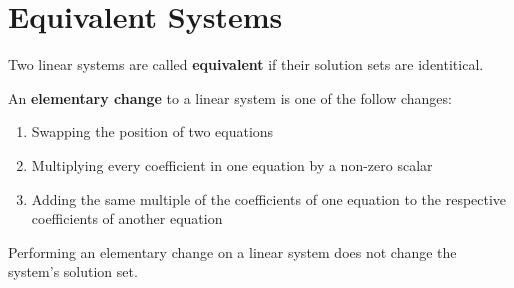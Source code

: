 \section{Equivalent Systems}
\begin{definition}[Equivalent]\label{def:equivalent}
    Two linear systems are called \textbf{equivalent} if their solution sets are identitical.
\end{definition}
\begin{definition}\label{def:elementary-change}
    An \textbf{elementary change} to a linear system is one of the follow changes:
    \begin{enumerate}
        \item Swapping the position of two equations
        \item Multiplying every coefficient in one equation by a non-zero scalar
        \item Adding the same multiple of the coefficients of one equation to the respective coefficients of another equation
    \end{enumerate}
\end{definition}
\begin{proposition}\label{prop:elementary-change}
    Performing an elementary change on a linear system does not change the system's solution set.
\end{proposition}


